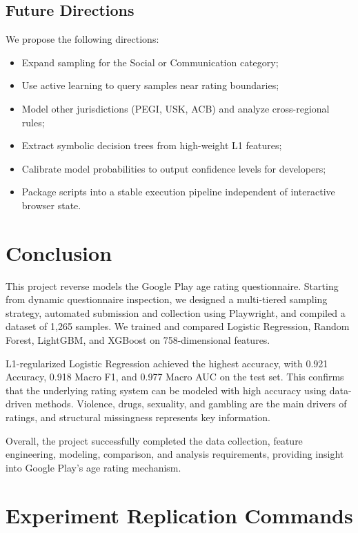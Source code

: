 \documentclass[11pt,a4paper]{article}
\begin{document}
\subsection{Future Directions}

We propose the following directions:
\begin{itemize}[leftmargin=2em]
  \item Expand sampling for the Social or Communication category;
  \item Use active learning to query samples near rating boundaries;
  \item Model other jurisdictions (PEGI, USK, ACB) and analyze cross-regional rules;
  \item Extract symbolic decision trees from high-weight L1 features;
  \item Calibrate model probabilities to output confidence levels for developers;
  \item Package scripts into a stable execution pipeline independent of interactive browser state.
\end{itemize}

\section{Conclusion}

This project reverse models the Google Play age rating questionnaire. Starting from dynamic questionnaire inspection, we designed a multi-tiered sampling strategy, automated submission and collection using Playwright, and compiled a dataset of 1,265 samples. We trained and compared Logistic Regression, Random Forest, LightGBM, and XGBoost on 758-dimensional features.

L1-regularized Logistic Regression achieved the highest accuracy, with 0.921 Accuracy, 0.918 Macro F1, and 0.977 Macro AUC on the test set. This confirms that the underlying rating system can be modeled with high accuracy using data-driven methods. Violence, drugs, sexuality, and gambling are the main drivers of ratings, and structural missingness represents key information.

Overall, the project successfully completed the data collection, feature engineering, modeling, comparison, and analysis requirements, providing insight into Google Play's age rating mechanism.

\appendix
\section{Experiment Replication Commands}
\end{document}
